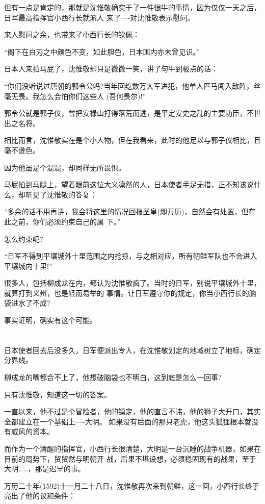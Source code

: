 \documentclass[11pt,a4paper,onecolumn]{article}
\begin{document}
但有一点是肯定的，那就是沈惟敬确实干了一件很牛的事情，因为仅仅一天之后，日军最高指挥官小西行长就派人
来了----对沈惟敬表示慰问。

来人慰问之余，也带来了小西行长的钦佩：

``阁下在白刃之中颜色不变，如此胆色，日本国内亦未曾见识。''

日本人来拍马屁了，沈惟敬却只是微微一笑，讲了句牛到极点的话：

``你们没听说过唐朝的郭令公吗?当年回纥数万大军进犯，他单人匹马闯入敌阵，丝毫无畏。我怎么会怕你们这些人
(吾何畏尔)!''

郭令公就是郭子仪，曾把安禄山打得落荒而逃，是平定安史之乱的主要功臣，不世出之名将。

相比而言，沈惟敬实在是个小人物，但在我看来，此时的他足以与郭子仪相比，且毫不逊色。

因为他虽是个混混，却同样无所畏惧。

马屁拍到马腿上，望着眼前这位大义凛然的人，日本使者手足无措，正不知该说什么，却听见了沈惟敬的答复：

``多余的话不用再讲，我会将这里的情况回报圣皇(即万历)，自然会有处置，但在此之前，你们必须约束自己的属
下。''

怎么约束呢?

``日军不得到平壤城外十里范围之内抢掠，与之相对应，所有朝鲜军队也不会进入平壤城内十里!''

很多人，包括柳成龙在内，都认为沈惟敬疯了。当时的日军，别说平壤城外十里，就算打到义州，也是轻而易举的
事情。让日军遵守你的规定，你当小西行长的脑袋进水了不成?

事实证明，确实有这个可能。

\section[\thesection]{}

日本使者回去后没多久，日军便派出专人，在沈惟敬划定的地域树立了地标，确定分界线。

柳成龙的嘴都合不上了，他想破脑袋也不明白，这到底是怎么一回事?

只有沈惟敬，知道这一切的答案。

一直以来，他不过是个冒险者，他的镇定，他的直言不讳，他的狮子大开口，其实全都建立在一个基础上----大明。
如果没有后面的那只老虎，他这头狐狸根本就没有威风的资本。

而作为一个清醒的指挥官，小西行长很清楚，大明是一台沉睡的战争机器，如果在目前的局势下，贸贸然与明朝开
战，后果不堪设想，必须稳固现有的战果，至于大明……，那是迟早的事。

万历二十年(1592)十一月二十八日，沈惟敬再次来到朝鲜，这一回，小西行长终于亮出了他的议和条件：
\end{document}
